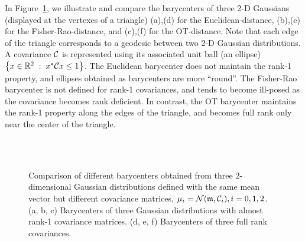 
In Figure~\ref{fig-barycenter-gaussian}, we illustrate and compare the barycenters of three 2-D Gaussians (displayed at the vertexes of a triangle) (a),(d) for the Euclidean-distance, (b),(e) for the Fisher-Rao-distance, and (c),(f) for the OT-distance. 
Note that each edge of the triangle corresponds to a geodesic between two 2-D Gaussian distributions.
A covariance $\mathcal{C}$ is represented using its associated unit ball (an ellipse) $\left\{ x \in \mathbb{R}^2 \;:\;  x^* \mathcal{C} x \leq 1  \right\}$. The Euclidean barycenter does not maintain the rank-1 property, and ellipses obtained as barycenters are more ``round''. The Fisher-Rao barycenter is not defined for rank-1 covariances, and tends to become ill-posed as the covariance becomes rank deficient. In contrast, the OT barycenter maintains the rank-1 property along the edges of the triangle, and becomes full rank only near the center of the triangle.

\begin{figure}[ht!]
  \centering
  \\

  \\
  \caption{Comparison of different barycenters obtained from three 2-dimensional Gaussian distributions defined with the same mean vector but different covariance matrices, $\mu_i = \mathcal{N}({\frak m}, \mathcal{C}_i), i=0,1,2$.
  (a, b, c) Barycenters of three Gaussian distributions with almost rank-1 covariance matrices. 
  (d, e, f) Barycenters of three full rank covariances.
  }
  \label{fig-barycenter-gaussian}
\end{figure}

